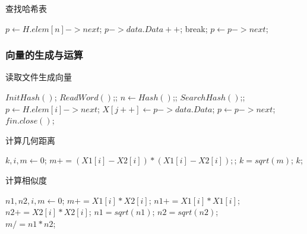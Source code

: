 \begin{algorithm}[H]
	\caption{查找哈希表}
	\begin{algorithmic}[1] %
			\State $p \gets H.elem[n]->next$;
					\State $p->data.Data++$;
					\State break;
				\EndIf
				\State $p \gets p->next$;
			\EndWhile
		\EndFunction
	\end{algorithmic}\label{alg:algorithm2}
\end{algorithm}

\subsubsection{向量的生成与运算}
\begin{algorithm}[H]
	\caption{读取文件生成向量}
	\begin{algorithmic}[1] %
			\State $InitHash()$;
				\State $ReadWord()$;;
				\State $n \gets Hash()$;;
				\State $SearchHash()$;;
			\EndWhile
				\State $p \gets H.elem[i]->next$;
					\State $X[j++] \gets p->data.Data$;
					\State $p \gets p->next$;
				\EndWhile
			\EndFor
			\State $fin.close()$;
		\EndFunction
	\end{algorithmic}\label{alg:algorithm3}
\end{algorithm}

\begin{algorithm}[H]
	\caption{计算几何距离}
	\begin{algorithmic}[1] %
			\State $k,i,m \gets 0$;
			\For{$each\ i\ in\ [0,16)$}
				\State $m += (X1[i] - X2[i]) * (X1[i] - X2[i]);$;
			\EndFor
			\State $k = sqrt(m)$;
			\Return $k$;
		\EndFunction
	\end{algorithmic}\label{alg:algorithm4}
\end{algorithm}

\begin{algorithm}[H]
	\caption{计算相似度}
	\begin{algorithmic}[1] %
			\State $n1,n2,i,m \gets 0$;
			\For{$each\ i\ in\ [0,16)$}
				\State $m += X1[i] * X2[i]$;
				\State $n1 += X1[i] * X1[i]$;
				\State $n2 += X2[i] * X2[i]$;
			\EndFor
			\State $n1 = sqrt(n1)$;
			\State $n2 = sqrt(n2)$;\\
			\Return $m /= n1 * n2$;
		\EndFunction
	\end{algorithmic}\label{alg:algorithm5}
\end{algorithm}

